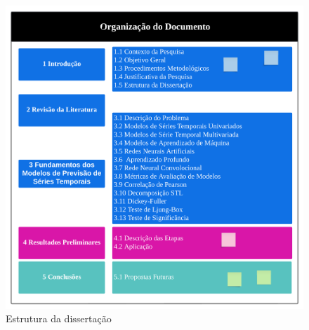 \begin{figure}[!htb]
	\centering
	\caption{Estrutura da dissertação}
	\label{fig:estrutura}
	\includegraphics[width=0.75\linewidth]{Introducao/Figuras/estrutura}
	
	
\end{figure}

